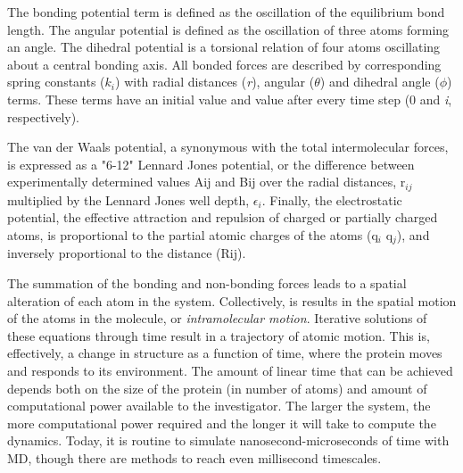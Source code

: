 \documentclass[12pt]{ucsddissertation}
\begin{document}
\begin{dissertationintroduction}
The bonding potential term is defined as the oscillation of the equilibrium bond length. The angular potential is defined as the oscillation of three atoms forming an angle. The dihedral potential is a torsional relation of four atoms oscillating about a central bonding axis. All bonded forces are described by corresponding spring constants (${k}_{i}$) with radial distances (\textit{r}), angular ($\theta$) and dihedral angle ($\phi$) terms. These terms have an initial value and value after every time step (0 and \textit{i}, respectively). 

The van der Waals potential, a synonymous with the total intermolecular forces, is expressed as a "6-12" Lennard Jones potential, or the difference between experimentally determined values Aij and Bij over the radial distances, r$_{ij}$ multiplied by the Lennard Jones well depth, $\epsilon_{i}$. Finally, the electrostatic potential, the effective attraction and repulsion of charged or partially charged atoms, is proportional to the partial atomic charges of the atoms (q$_{i}$ q$_{j}$), and inversely proportional to the distance (Rij). 

The summation of the bonding and non-bonding forces leads to a spatial alteration of each atom in the system. Collectively, is results in the spatial motion of the atoms in the molecule, or \textit{intramolecular motion}. Iterative solutions of these equations through time result in a trajectory of atomic motion. This is, effectively, a change in structure as a function of time, where the protein moves and responds to its environment. The amount of linear time that can be achieved depends both on the size of the protein (in number of atoms) and amount of computational power available to the investigator. The larger the system, the more computational power required and the longer it will take to compute the dynamics. Today, it is routine to simulate nanosecond-microseconds of time with MD, though there are methods to reach even millisecond timescales\cite{Shaw2009,Pierce2012}. 


\end{dissertationintroduction}
\end{document}
